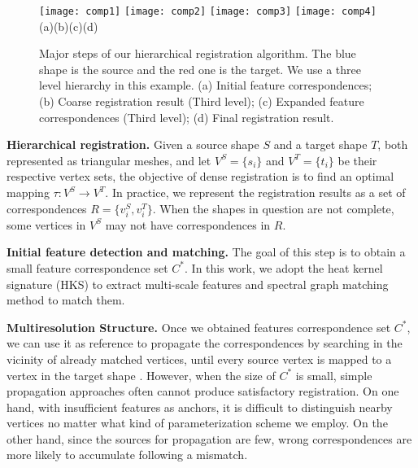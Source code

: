\begin{figure}
\centering
  \texttt{[image: comp1]}
\hspace{10pt}
  \texttt{[image: comp2]}
\hspace{10pt}
  \texttt{[image: comp3]}
\hspace{10pt}
  \texttt{[image: comp4]}\\
(a)\hspace{0.21\linewidth}(b)\hspace{0.21\linewidth}(c)\hspace{0.21\linewidth}(d)
  \caption[Steps of hierarchical registration algorithm.]
  {Major steps of our hierarchical registration algorithm. The blue shape is the source and the red one is the target. We use a three level hierarchy in this example. (a) Initial feature correspondences; (b) Coarse registration result (Third level); (c) Expanded feature correspondences (Third level); (d) Final registration result.}
\label{fig:components}
\end{figure}

\textbf{Hierarchical registration.}
Given a source shape $S$ and a target shape $T$, both represented as triangular meshes, and let $V^S=\{s_i\}$ and $V^T=\{t_i\}$ be their respective vertex sets, the objective of dense registration is to find an optimal mapping $\tau: V^S \to V^T$. In practice, we represent the registration results as a set of correspondences $R=\{v^S_i, v^T_i\}$. When the shapes in question are not complete, some vertices in $V^S$ may not have correspondences in $R$.

\textbf{Initial feature detection and matching.}
The goal of this step is to obtain a small feature correspondence set $C^*$.
In this work, we adopt the heat kernel signature (HKS) \cite{Sun:2009:CGF}
to extract multi-scale features and spectral graph matching
method \cite{Leordeanu:2005a:ICCV} to match them.

\textbf{Multiresolution Structure.}
Once we obtained features correspondence set $C^*$, we can use it as reference to propagate the correspondences by searching in the vicinity of already matched vertices, until every source vertex is mapped to a vertex in the target shape \cite{Hou:2011:TVCG,Huang:2008:CGF}. However, when the size of $C^*$ is small, simple propagation approaches often cannot produce satisfactory registration. On one hand, with insufficient features as anchors, it is difficult to distinguish nearby vertices no matter what kind of parameterization scheme we employ. On the other hand, since the sources for propagation are few, wrong correspondences are more likely to accumulate following a mismatch.


